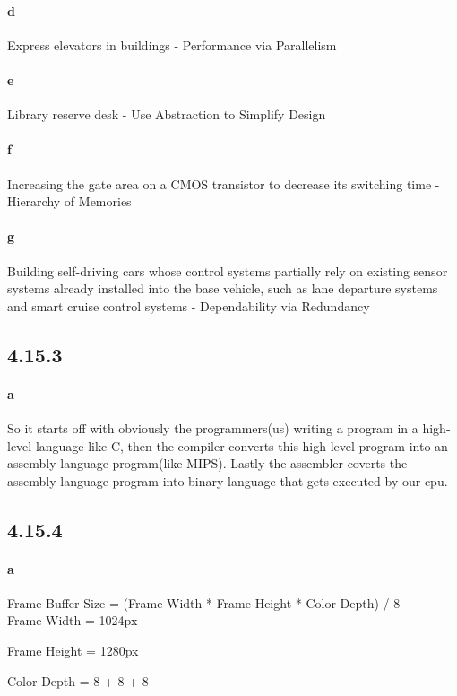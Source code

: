 \documentclass{article}
\begin{document}
    \paragraph*{d} Express elevators in buildings - Performance via Parallelism
    \paragraph*{e} Library reserve desk - Use Abstraction to Simplify Design
    \paragraph*{f} Increasing the gate area on a CMOS transistor to decrease its switching time - Hierarchy of Memories
    \paragraph*{g} Building self-driving cars whose control systems partially rely on existing sensor systems already installed into the base vehicle, such as lane departure systems and smart cruise control systems - Dependability via Redundancy

    \subsection*{4.15.3}
    \paragraph*{a} So it starts off with obviously the programmers(us) writing a program in a high-level language like C, then the compiler converts this high level program into an assembly language program(like MIPS). Lastly the assembler coverts the assembly language program into binary language that gets executed by our cpu.

    \subsection*{4.15.4}
    \paragraph*{a} 
    Frame Buffer Size = (Frame Width * Frame Height * Color Depth) / 8 \\

    Frame Width = 1024px 

    Frame Height = 1280px 

    Color Depth = 8 + 8 + 8 \\
\end{document}
